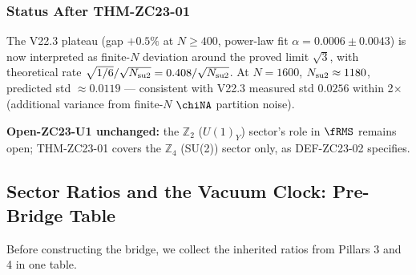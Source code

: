 \documentclass[12pt, a4paper]{article}
\begin{document}
\subsubsection{Status After THM-ZC23-01}

\begin{keybox}[title={CONJ-ZC23-01 $\to$ THM-ZC23-01 (promoted)}]
The V22.3 plateau (gap $+0.5\%$ at $N\geq 400$, power-law fit
$\alpha = 0.0006\pm 0.0043$) is now interpreted as finite-$N$
deviation around the proved limit $\sqrt{3}$, with theoretical
rate $\sqrt{1/6}/\sqrt{N_{\rm su2}} = 0.408/\sqrt{N_{\rm su2}}$.
At $N = 1600$, $N_{\rm su2} \approx 1180$, predicted std
$\approx 0.0119$ --- consistent with V22.3 measured std
$0.0256$ within 2$\times$ (additional variance from finite-$N$
$\chiNA$ partition noise).

\textbf{Open-ZC23-U1 unchanged:} the $\mathbb{Z}_2$ ($U(1)_Y$)
sector's role in $\fRMS$ remains open; THM-ZC23-01 covers the
$\mathbb{Z}_4$ (SU(2)) sector only, as DEF-ZC23-02 specifies.
\end{keybox}

\subsection{Sector Ratios and the Vacuum Clock: Pre-Bridge Table}
\label{sec:pre-bridge}

Before constructing the bridge, we collect the inherited
ratios from Pillars 3 and 4 in one table.
\end{document}
